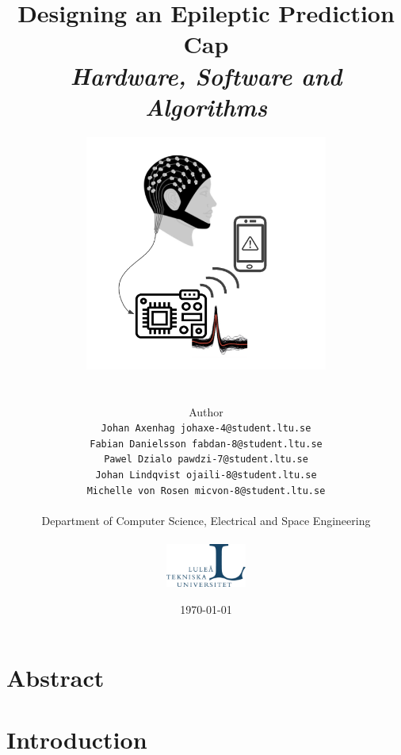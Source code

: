 \documentclass{article}
\title{Designing an Epileptic Prediction Cap\\
\textit{Hardware, Software and Algorithms}}
\author{\includegraphics[width=0.6\textwidth]{images/front.png} \\ \\ \\
Author \\
{\tt Johan Axenhag johaxe-4@student.ltu.se} \\
{\tt Fabian Danielsson fabdan-8@student.ltu.se} \\
{\tt Pawel Dzialo pawdzi-7@student.ltu.se} \\
{\tt Johan Lindqvist ojaili-8@student.ltu.se} \\
{\tt Michelle von Rosen micvon-8@student.ltu.se} \\
\\Department of Computer Science, Electrical and Space Engineering \\ \\
\includegraphics[width=0.2\textwidth]{images/ltu_swe.jpg}}
\date{\today}
\begin{document}
\maketitle
\thispagestyle{empty}%
\setcounter{page}{0} %
\newpage






\section*{Abstract}

 
\newpage

\tableofcontents
\newpage

%
%



\newpage
\setcounter{page}{1} %
\section{Introduction}

\end{document}
